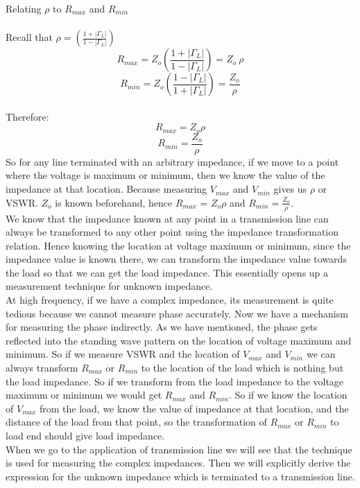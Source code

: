 Relating $\rho$ to $R_{max}$ and  $R_{min}$\\\\
Recall that $\rho =  (\frac{1 + |\Gamma_L|}{1 - |\Gamma_L|})$
\begin{equation*}
R_{max}  = Z_o  (\frac{1 + |\Gamma_L|}{1 - |\Gamma_L|}) = Z_o    \  \rho
\end{equation*}
\begin{equation*}
R_{min}  = Z_o  (\frac{1 - |\Gamma_L|}{1 + |\Gamma_L|}) =\frac{Z_o}{\rho}
\end{equation*}
\\Therefore:
\begin{equation}
R_{max} = Z_o \rho
\end{equation}
\begin{equation}
R_{min} = \frac{Z_o}{\rho}
\end{equation}
So for any line terminated with an arbitrary impedance, if we move to a point where the voltage is maximum or minimum, then we know the value of the impedance at that location. Because measuring $V_{max}$ and $V_{min}$ gives us $\rho$ or VSWR. $Z_o$ is known beforehand, hence $R_{max}$ = $Z_o \rho$ and $R_{min} = \frac{Z_o}{\rho}$. \\
We know that the impedance known at any point in a transmission line can always be transformed to any other point using the impedance transformation relation. Hence knowing the location at voltage maximum or minimum, since the impedance value is known there, we can transform the impedance value towards the load so that we can get the load impedance. This essentially opens up a measurement technique for unknown impedance. \\
At high frequency, if we have a complex impedance, its measurement is quite tedious because we cannot measure phase accurately. Now we have a mechanism for measuring the phase indirectly. As we have mentioned, the phase gets reflected into the standing wave pattern on the location of voltage maximum and minimum. So if we measure VSWR and the location of $V_{max}$ and $V_{min}$ we can always transform $R_{max}$ or $R_{min}$ to the location of the load which is nothing but the load impedance. So if we transform from the load impedance to the voltage maximum or minimum we would get $R_{max}$ and $R_{min}$. So if we know the location of $V_{max}$ from the load, we know the value of impedance at that location, and the distance of the load from that point, so the transformation of $R_{max}$ or $R_{min}$ to load end should give load impedance.\\
When we go to the application of transmission line we will see that the technique is used for measuring the complex impedances. Then we will explicitly derive the expression for the unknown impedance which is terminated to a transmission line. 